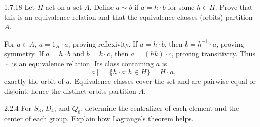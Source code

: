 \documentclass[11pt,oneside]{article}
\begin{document}

\begin{exercise}{1.7.18}
Let $H$ act on a set $A$. Define $a\sim b$ if $a=h\cdot b$ for some $h\in H$. Prove that this is an equivalence relation and that the equivalence classes (orbits) partition $A$.
\end{exercise}

\begin{solution}
For $a\in A$, $a=1_H\cdot a$, proving reflexivity. If $a=h\cdot b$, then $b=h^{-1}\cdot a$, proving symmetry. If $a=h\cdot b$ and $b=k\cdot c$, then $a=(hk)\cdot c$, proving transitivity. Thus $\sim$ is an equivalence relation. Its class containing $a$ is
\[
 [a]=\{h\cdot a:h\in H\}=H\cdot a,
\]
exactly the orbit of $a$. Equivalence classes cover the set and are pairwise equal or disjoint, hence the distinct orbits partition $A$.
\end{solution}

\begin{exercise}{2.2.4}
For $S_3$, $D_4$, and $Q_8$, determine the centralizer of each element and the center of each group. Explain how Lagrange's theorem helps.
\end{exercise}
\end{document}
